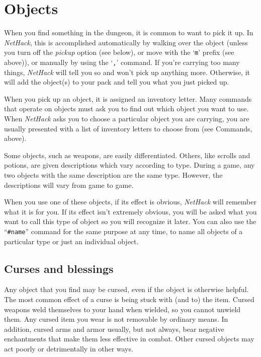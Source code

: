 \section{Objects}

When you find something in the dungeon, it is common to want to pick
it up.  In {\it NetHack}, this is accomplished automatically by walking over
the object (unless you turn off the
{\it pickup\/}
option (see below), or move with the `{\tt m}' prefix (see above)), or
manually by using the `{\tt ,}' command.  If you're carrying too many
things, {\it NetHack\/} will tell you so and won't pick up anything more.
Otherwise, it will add the object(s) to your pack and tell you what you
just picked up.

When you pick up an object, it is assigned an inventory letter.  Many
commands that operate on objects must ask you to find out which object
you want to use.  When {\it NetHack\/} asks you to choose a particular object
you are carrying, you are usually presented with a list of inventory
letters to choose from (see Commands, above).

Some objects, such as weapons, are easily differentiated.  Others, like
scrolls and potions, are given descriptions which vary according to
type.  During a game, any two objects with the same description are
the same type.  However, the descriptions will vary from game to game.

When you use one of these objects, if its effect is obvious, {\it NetHack\/}
will remember what it is for you.  If its effect isn't extremely
obvious, you will be asked what you want to call this type of object
so you will recognize it later.  You can also use the ``{\tt \#name}''
command for the same purpose at any time, to name all objects of a
particular type or just an individual object.

\subsection*{Curses and blessings}

Any object that you find may be cursed, even if the object is
otherwise helpful.  The most common effect of a curse is being stuck
with (and to) the item.  Cursed weapons weld themselves to your hand
when wielded, so you cannot unwield them.  Any cursed item you wear
is not removable by ordinary means.  In addition, cursed arms and armor
usually, but not always, bear negative enchantments that make them
less effective in combat.  Other cursed objects may act poorly or
detrimentally in other ways.

